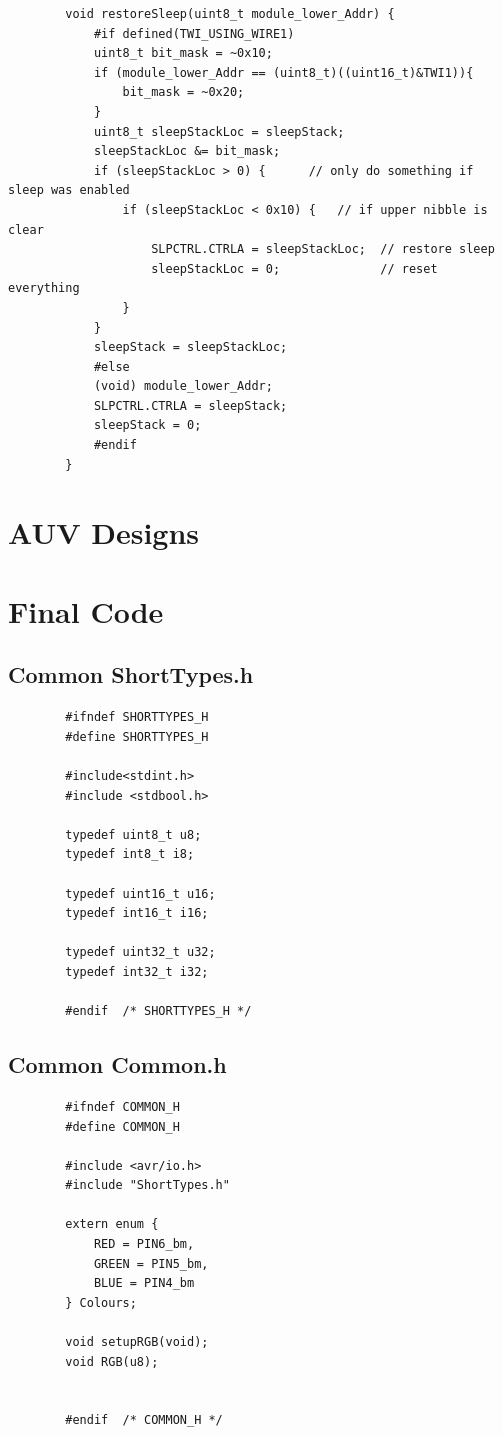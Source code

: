 \documentclass[11pt,a4paper,titlepage]{report}
\begin{document}
\begin{lstlisting}
		void restoreSleep(uint8_t module_lower_Addr) {
			#if defined(TWI_USING_WIRE1)
			uint8_t bit_mask = ~0x10;
			if (module_lower_Addr == (uint8_t)((uint16_t)&TWI1)){
				bit_mask = ~0x20;
			}
			uint8_t sleepStackLoc = sleepStack;
			sleepStackLoc &= bit_mask;
			if (sleepStackLoc > 0) {      // only do something if sleep was enabled
				if (sleepStackLoc < 0x10) {   // if upper nibble is clear
					SLPCTRL.CTRLA = sleepStackLoc;  // restore sleep
					sleepStackLoc = 0;              // reset everything
				}
			}
			sleepStack = sleepStackLoc;
			#else
			(void) module_lower_Addr;
			SLPCTRL.CTRLA = sleepStack;
			sleepStack = 0;
			#endif
		}
	\end{lstlisting}
	
	\section{AUV Designs}\label{appendix:auv_designs}
	\begin{center}
		
	\end{center}
	
	\section{Final Code}\label{appendix:auv_final_code}
	
	\subsection{Common ShortTypes.h}\label{appendix:final_code_short_types_h}
	\begin{lstlisting}
		#ifndef SHORTTYPES_H
		#define	SHORTTYPES_H
		
		#include<stdint.h>
		#include <stdbool.h>
		
		typedef uint8_t u8;
		typedef int8_t i8;
		
		typedef uint16_t u16;
		typedef int16_t i16;
		
		typedef uint32_t u32;
		typedef int32_t i32;
		
		#endif	/* SHORTTYPES_H */
	\end{lstlisting}
	
	\subsection{Common Common.h}\label{appendix:final_code_common_h}
	\begin{lstlisting}
		#ifndef COMMON_H
		#define	COMMON_H
		
		#include <avr/io.h>
		#include "ShortTypes.h"
		
		extern enum {
			RED = PIN6_bm,
			GREEN = PIN5_bm,
			BLUE = PIN4_bm
		} Colours;
		
		void setupRGB(void);
		void RGB(u8);
		
		
		#endif	/* COMMON_H */
	\end{lstlisting}
	
\end{document}
